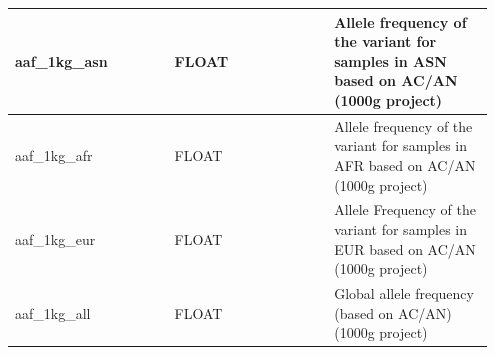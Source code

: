 \documentclass[letterpaper,10pt,english]{sphinxmanual}
\begin{document}
\begin{tabular}{|p{0.317\linewidth}|p{0.317\linewidth}|p{0.317\linewidth}|}
aaf\_1kg\_asn
 & 
FLOAT
 & 
Allele frequency of the variant for samples in ASN based on AC/AN (1000g project)
\\\hline

aaf\_1kg\_afr
 & 
FLOAT
 & 
Allele frequency of the variant for samples in AFR based on AC/AN (1000g project)
\\\hline

aaf\_1kg\_eur
 & 
FLOAT
 & 
Allele Frequency of the variant for samples in EUR based on AC/AN (1000g project)
\\\hline

aaf\_1kg\_all
 & 
FLOAT
 & 
Global allele frequency (based on AC/AN) (1000g project)
\\\hline
\end{tabular}
\end{document}
